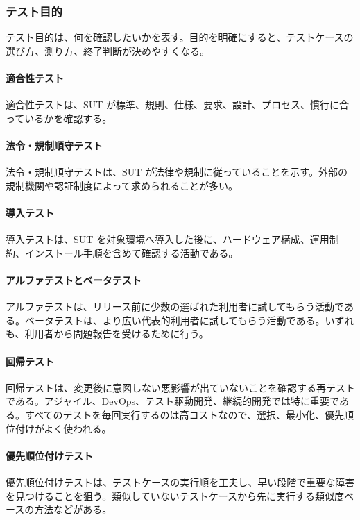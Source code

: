 \subsubsection{テスト目的}
テスト目的は、何を確認したいかを表す。目的を明確にすると、テストケースの選び方、測り方、終了判断が決めやすくなる。

\paragraph{適合性テスト}
適合性テストは、SUT が標準、規則、仕様、要求、設計、プロセス、慣行に合っているかを確認する。

\paragraph{法令・規制順守テスト}
法令・規制順守テストは、SUT が法律や規制に従っていることを示す。外部の規制機関や認証制度によって求められることが多い。

\paragraph{導入テスト}
導入テストは、SUT を対象環境へ導入した後に、ハードウェア構成、運用制約、インストール手順を含めて確認する活動である。

\paragraph{アルファテストとベータテスト}
アルファテストは、リリース前に少数の選ばれた利用者に試してもらう活動である。ベータテストは、より広い代表的利用者に試してもらう活動である。いずれも、利用者から問題報告を受けるために行う。

\paragraph{回帰テスト}
回帰テストは、変更後に意図しない悪影響が出ていないことを確認する再テストである。アジャイル、DevOps、テスト駆動開発、継続的開発では特に重要である。すべてのテストを毎回実行するのは高コストなので、選択、最小化、優先順位付けがよく使われる。

\paragraph{優先順位付けテスト}
優先順位付けテストは、テストケースの実行順を工夫し、早い段階で重要な障害を見つけることを狙う。類似していないテストケースから先に実行する類似度ベースの方法などがある。


